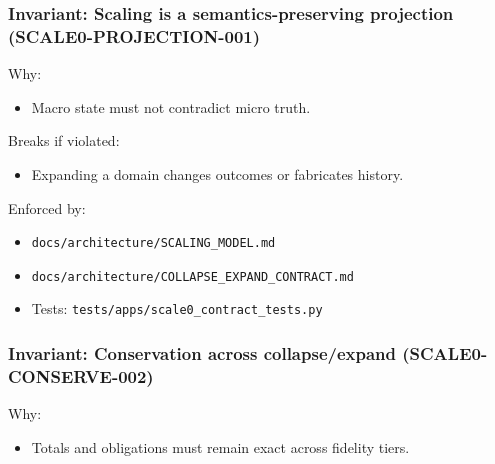 \documentclass[9pt,a4paper,openany]{book}
\begin{document}
\subsubsection{Invariant: Scaling is a semantics-preserving projection (SCALE0-PROJECTION-001)}


Why:



\begin{itemize}
\item Macro state must not contradict micro truth.\allowbreak{}
\end{itemize}


Breaks if violated:



\begin{itemize}
\item Expanding a domain changes outcomes or fabricates history.\allowbreak{}
\end{itemize}


Enforced by:



\begin{itemize}
\item \texttt{docs/\allowbreak{}architecture/\allowbreak{}SCALING\_\allowbreak{}MODEL.\allowbreak{}md}
\end{itemize}


\begin{itemize}
\item \texttt{docs/\allowbreak{}architecture/\allowbreak{}COLLAPSE\_\allowbreak{}EXPAND\_\allowbreak{}CONTRACT.\allowbreak{}md}
\end{itemize}


\begin{itemize}
\item Tests: \texttt{tests/\allowbreak{}apps/\allowbreak{}scale0\_\allowbreak{}contract\_\allowbreak{}tests.\allowbreak{}py}
\end{itemize}





\subsubsection{Invariant: Conservation across collapse/expand (SCALE0-CONSERVE-002)}


Why:



\begin{itemize}
\item Totals and obligations must remain exact across fidelity tiers.\allowbreak{}
\end{itemize}
\end{document}
